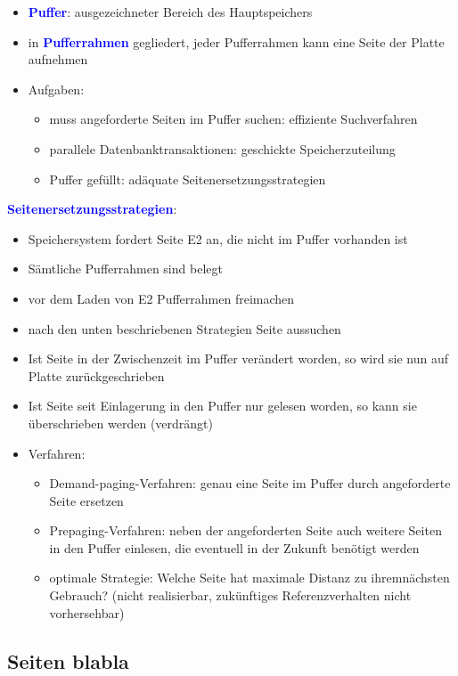 \documentclass{scrartcl}
\newcommand{\key}[1]{{\textcolor{blue}{\textbf{#1}}}}
\begin{document}
\begin{itemize}
	\itemsep0em
	\item \key{Puffer}: ausgezeichneter Bereich des Hauptspeichers
	\item in \key{Pufferrahmen} gegliedert, jeder Pufferrahmen kann eine Seite
	der Platte aufnehmen
	\item Aufgaben:
	\begin{itemize}
		\item muss angeforderte Seiten im Puffer suchen: effiziente Suchverfahren
		\item parallele Datenbanktransaktionen: geschickte Speicherzuteilung
		\item Puffer gefüllt: adäquate Seitenersetzungsstrategien
	\end{itemize}
\end{itemize}

\key{Seitenersetzungsstrategien}:
\begin{itemize}
	\itemsep0em
	\item Speichersystem fordert Seite E2 an, die nicht im Puffer vorhanden	ist
	\item Sämtliche Pufferrahmen sind belegt
	\item vor dem Laden von E2 Pufferrahmen freimachen
	\item nach den unten beschriebenen Strategien Seite aussuchen
	\item Ist Seite in der Zwischenzeit im Puffer verändert worden, so wird sie nun auf Platte zurückgeschrieben
	\item Ist Seite seit Einlagerung in den Puffer nur gelesen worden, so kann sie überschrieben werden (verdrängt)
	\item Verfahren:
	\begin{itemize}
		\item Demand-paging-Verfahren: genau eine Seite im Puffer durch angeforderte Seite ersetzen
		\item Prepaging-Verfahren: neben der angeforderten Seite auch weitere Seiten in den Puffer einlesen, die eventuell in der Zukunft benötigt werden
		\item optimale Strategie: Welche Seite hat maximale Distanz zu ihremnächsten Gebrauch? (nicht realisierbar, zukünftiges Referenzverhalten nicht vorhersehbar)
	\end{itemize}
\end{itemize}

\subsection{Seiten blabla}
\end{document}
